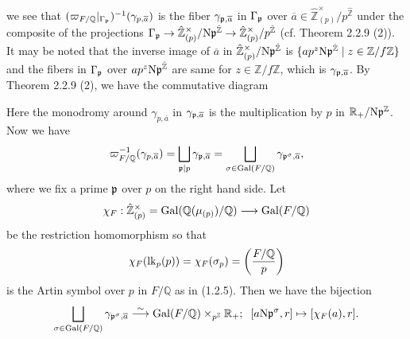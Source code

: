 \documentclass[12pt, leqno]{article}
\begin{document}
we see that $(\varpi_{F/\mathbb{Q}}|_{\Gamma_{\frak{p}}})^{-1}(\gamma_{p, \overline{a}})$ is the fiber $\gamma_{\frak{p}, \overline{a}}$ in $\Gamma_{\frak{p}}$ over $\overline{a} \in \hat{\mathbb{Z}}_{(p)}^{\times}/p^{\hat{\mathbb{Z}}}$ under the composite of the projections 
$\Gamma_{\frak{p}} \rightarrow \hat{\mathbb{Z}}_{(p)}^{\times}/{\rm N}\frak{p}^{\hat{\mathbb{Z}}} \rightarrow  \hat{\mathbb{Z}}_{(p)}^{\times}/p^{\hat{\mathbb{Z}}} $ (cf. Theorem 2.2.9 (2)). 
It may be noted that the inverse image of $\overline{a}$ in $\hat{\mathbb{Z}}_{(p)}^{\times}/{\rm N}\frak{p}^{\hat{\mathbb{Z}}}$ is $\{ ap^z {\rm N}\frak{p}^{\hat{\mathbb{Z}}} \mid 
z \in  \mathbb{Z}/f\mathbb{Z} \}$ and the fibers in  $\Gamma_{\frak{p}}$ over $a p^z {\rm N}\frak{p}^{\hat{\mathbb{Z}}}$ are same for $z \in \mathbb{Z}/f\mathbb{Z}$, which is $\gamma_{\frak{p}, \overline{a}}$.
By Theorem 2.2.9 (2), we have the commutative diagram
\begin{center}
\end{center}
Here the monodromy around $\gamma_{p, \overline{a}}$ in $\gamma_{\frak{p}, \overline{a}}$ is the multiplication by $p$ in 
$\mathbb{R}_+/{\rm N}\frak{p}^{\mathbb{Z}}$.  Now we have
$$  \varpi_{F/\mathbb{Q}}^{-1}(\gamma_{p, \overline{a}}) = \bigsqcup_{\frak{p} \mid p} \gamma_{\frak{p}, \overline{a}} = \bigsqcup_{\sigma \in {\rm Gal}(F/\mathbb{Q})} \gamma_{\frak{p}^{\sigma}, \overline{a}}, $$
where we fix a prime $\frak{p}$ over $p$ on the right hand side. Let
$$ \chi_F : \hat{\mathbb{Z}}_{(p)}^{\times} = {\rm Gal}(\mathbb{Q}(\mu_{(p)})/\mathbb{Q}) \longrightarrow {\rm Gal}(F/\mathbb{Q})
$$
be the restriction homomorphism so that 
$$ \chi_F({\rm lk}_p(p)) = \chi_F(\sigma_p) = \left( \frac{F/\mathbb{Q}}{p} \right) $$
is the Artin symbol over $p$ in $F/\mathbb{Q}$ as in (1.2.5). Then we have the bijection
$$ \bigsqcup_{\sigma \in {\rm Gal}(F/\mathbb{Q})} \gamma_{\frak{p}^{\sigma}, \overline{a}}
\stackrel{\sim}{\longrightarrow} {\rm Gal}(F/\mathbb{Q}) \times_{p^{\mathbb{Z}}}  \mathbb{R}_+; \; \; [a {\rm N}\frak{p}^{\sigma}, r] \mapsto [\chi_F(a), r].$$
\end{document}
